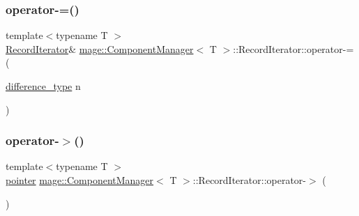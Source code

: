 \subsubsection{\texorpdfstring{operator-\/=()}{operator-=()}}
{\footnotesize\ttfamily template$<$typename T $>$ \\
\mbox{\hyperlink{classmage_1_1_component_manager_1_1_record_iterator}{Record\+Iterator}}\& \mbox{\hyperlink{classmage_1_1_component_manager}{mage\+::\+Component\+Manager}}$<$ T $>$\+::Record\+Iterator\+::operator-\/= (\begin{DoxyParamCaption}\item[{\mbox{\hyperlink{classmage_1_1_component_manager_1_1_record_iterator_a3ca7b08fca57e3f69c5de58be46edd70}{difference\+\_\+type}}}]{n }\end{DoxyParamCaption})\hspace{0.3cm}{\ttfamily [noexcept]}}

\mbox{\label{classmage_1_1_component_manager_1_1_record_iterator_a0d7e01342bbc5d861d19c9391969ba77}} 
\subsubsection{\texorpdfstring{operator-\/$>$()}{operator->()}\hspace{0.1cm}{\footnotesize\ttfamily [1/2]}}
{\footnotesize\ttfamily template$<$typename T $>$ \\
\mbox{\hyperlink{classmage_1_1_component_manager_1_1_record_iterator_a2d5e24d6c2530fafb1c3c7fdf6875ea8}{pointer}} \mbox{\hyperlink{classmage_1_1_component_manager}{mage\+::\+Component\+Manager}}$<$ T $>$\+::Record\+Iterator\+::operator-\/$>$ (\begin{DoxyParamCaption}{ }\end{DoxyParamCaption})\hspace{0.3cm}{\ttfamily [delete]}}

\mbox{\label{classmage_1_1_component_manager_1_1_record_iterator_a850cc2efc750afcb3d1b6b4ef0aa04b6}} 
